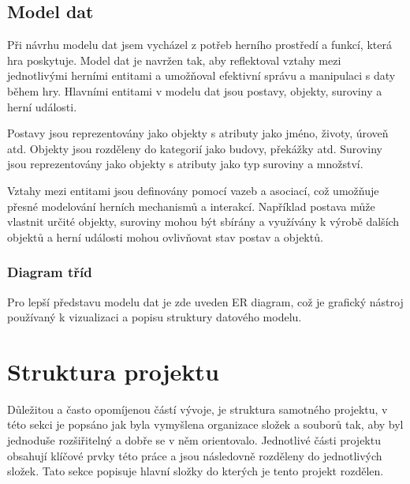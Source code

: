 
\subsection{Model dat}
Při návrhu modelu dat jsem vycházel z potřeb herního prostředí a funkcí, která hra poskytuje. Model dat je navržen tak, aby reflektoval vztahy mezi jednotlivými herními entitami a umožňoval efektivní správu a manipulaci s daty během hry. Hlavními entitami v modelu dat jsou postavy, objekty, suroviny a herní události.

Postavy jsou reprezentovány jako objekty s atributy jako jméno, životy, úroveň atd. Objekty jsou rozděleny do kategorií jako budovy, překážky atd. Suroviny jsou reprezentovány jako objekty s atributy jako typ suroviny a množství.

Vztahy mezi entitami jsou definovány pomocí vazeb a asociací, což umožňuje přesné modelování herních mechanismů a interakcí. Například postava může vlastnit určité objekty, suroviny mohou být sbírány a využívány k výrobě dalších objektů a herní události mohou ovlivňovat stav postav a objektů.

\subsubsection{Diagram tříd}
Pro lepší představu modelu dat je zde uveden ER diagram, což je grafický nástroj používaný k vizualizaci a popisu struktury datového modelu.

\newpage
\section{Struktura projektu}
Důležitou a často opomíjenou částí vývoje, je struktura samotného projektu, v této sekci je popsáno jak byla vymyšlena organizace složek a souborů tak, aby byl jednoduše rozšiřitelný a dobře se v něm orientovalo. Jednotlivé části projektu obsahují klíčové prvky této práce a jsou následovně rozděleny do jednotlivých složek. Tato sekce popisuje hlavní složky do kterých je tento projekt rozdělen.


